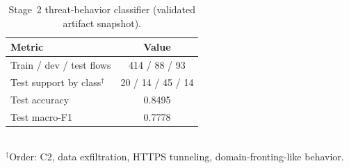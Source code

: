 \begin{table}[t]
  \centering
  \caption{Stage~2 threat-behavior classifier (validated artifact snapshot).}
  \label{tab:exp-stage2}
  \begin{tabular}{@{}lc@{}}
    \toprule
    Metric & Value \\
    \midrule
    Train / dev / test flows & 414 / 88 / 93 \\
    Test support by class$^{\dagger}$ & 20 / 14 / 45 / 14 \\
    Test accuracy & 0.8495 \\
    Test macro-F1 & 0.7778 \\
    \bottomrule
  \end{tabular}\\[-2pt]
  {\footnotesize $^{\dagger}$Order: C2, data exfiltration, HTTPS tunneling, domain-fronting-like behavior.}
\end{table}
